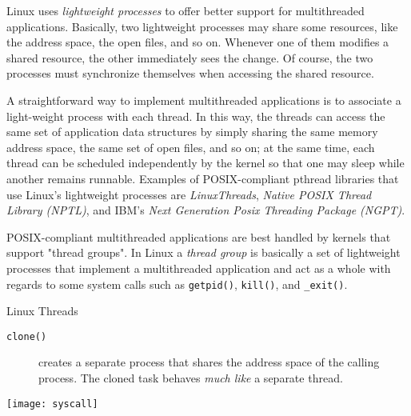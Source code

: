 Linux uses \emph{lightweight processes} to offer better support for multithreaded
applications. Basically, two lightweight processes may share some resources, like the
address space, the open files, and so on. Whenever one of them modifies a shared resource,
the other immediately sees the change. Of course, the two processes must synchronize
themselves when accessing the shared resource.

A straightforward way to implement multithreaded applications is to associate a
light-weight process with each thread. In this way, the threads can access the same set of
application data structures by simply sharing the same memory address space, the same set
of open files, and so on; at the same time, each thread can be scheduled independently by
the kernel so that one may sleep while another remains runnable. Examples of
POSIX-compliant pthread libraries that use Linux's lightweight processes are
\emph{LinuxThreads}, \emph{Native POSIX Thread Library (NPTL)}, and IBM's \emph{Next
  Generation Posix Threading Package (NGPT)}.

POSIX-compliant multithreaded applications are best handled by kernels that support
"thread groups". In Linux a \emph{thread group} is basically a set of lightweight
processes that implement a multithreaded application and act as a whole with regards to
some system calls such as \texttt{getpid()}, \texttt{kill()}, and \texttt{\_exit()}.


\begin{frame}{Linux Threads}
  \begin{description}
  \item[\texttt{clone()}] creates a separate process that shares the address space of the
    calling process. The cloned task behaves \emph{much like} a separate thread.
  \end{description}
  \begin{center}
    \texttt{[image: syscall]}
  \end{center}
\end{frame}

